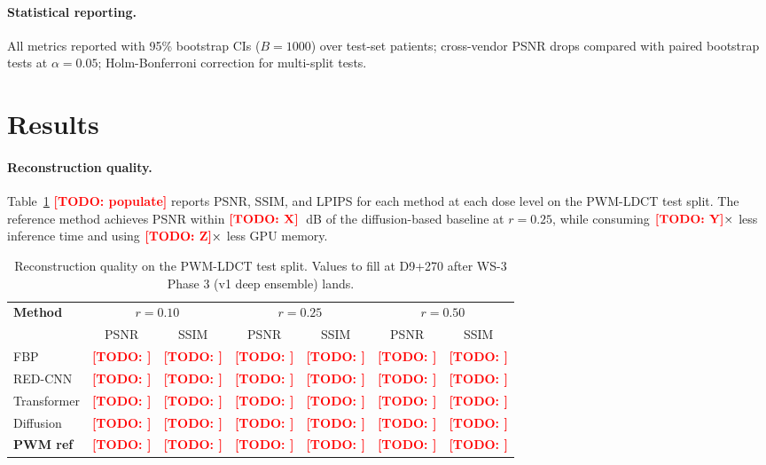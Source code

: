 \documentclass{article}  %
\newcommand{\todo}[1]{\textcolor{red}{\textbf{[TODO: #1]}}}
\begin{document}
\paragraph{Statistical reporting.} All metrics reported with 95\% bootstrap CIs ($B = 1000$) over test-set patients; cross-vendor PSNR drops compared with paired bootstrap tests at $\alpha = 0.05$; Holm-Bonferroni correction for multi-split tests.

\section{Results}
\label{sec:results}

\paragraph{Reconstruction quality.} Table~\ref{tab:reconstruction_quality} \todo{populate} reports PSNR, SSIM, and LPIPS for each method at each dose level on the PWM-LDCT test split. The reference method achieves PSNR within $\todo{X}$~dB of the diffusion-based baseline at $r = 0.25$, while consuming $\todo{Y}\times$ less inference time and using $\todo{Z}\times$ less GPU memory.

\begin{table}[h]
    \centering
    \small
    \setlength{\tabcolsep}{4pt}
    \begin{tabular}{lcccccc}
        \toprule
        \textbf{Method} & \multicolumn{2}{c}{$r = 0.10$} & \multicolumn{2}{c}{$r = 0.25$} & \multicolumn{2}{c}{$r = 0.50$} \\
        & PSNR & SSIM & PSNR & SSIM & PSNR & SSIM \\
        \midrule
        FBP                & \todo{} & \todo{} & \todo{} & \todo{} & \todo{} & \todo{} \\
        RED-CNN            & \todo{} & \todo{} & \todo{} & \todo{} & \todo{} & \todo{} \\
        Transformer        & \todo{} & \todo{} & \todo{} & \todo{} & \todo{} & \todo{} \\
        Diffusion          & \todo{} & \todo{} & \todo{} & \todo{} & \todo{} & \todo{} \\
        \textbf{PWM ref}   & \todo{} & \todo{} & \todo{} & \todo{} & \todo{} & \todo{} \\
        \bottomrule
    \end{tabular}
    \caption{Reconstruction quality on the PWM-LDCT test split. Values to fill at D9+270 after WS-3 Phase 3 (v1 deep ensemble) lands.}
    \label{tab:reconstruction_quality}
\end{table}
\end{document}
